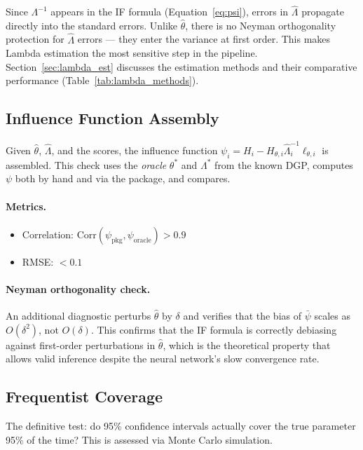 Since $\Lambda^{-1}$ appears in the IF formula (Equation~\ref{eq:psi}), errors in $\hat{\Lambda}$ propagate directly into the standard errors. Unlike $\hat{\theta}$, there is no Neyman orthogonality protection for $\hat{\Lambda}$ errors --- they enter the variance at first order. This makes Lambda estimation the most sensitive step in the pipeline. Section~\ref{sec:lambda_est} discusses the estimation methods and their comparative performance (Table~\ref{tab:lambda_methods}).

\subsection{Influence Function Assembly}\label{sec:eval_psi}

Given $\hat{\theta}$, $\hat{\Lambda}$, and the scores, the influence function $\psi_i = H_i - H_{\theta,i}\hat{\Lambda}_i^{-1}\ell_{\theta,i}$ is assembled. This check uses the \emph{oracle} $\theta^*$ and $\Lambda^*$ from the known DGP, computes $\psi$ both by hand and via the package, and compares.

\paragraph{Metrics.}
\begin{itemize}
    \item Correlation: $\mathrm{Corr}(\psi_{\text{pkg}}, \psi_{\text{oracle}}) > 0.9$
    \item RMSE: $< 0.1$
\end{itemize}

\paragraph{Neyman orthogonality check.} An additional diagnostic perturbs $\hat{\theta}$ by $\delta$ and verifies that the bias of $\bar{\psi}$ scales as $O(\delta^2)$, not $O(\delta)$. This confirms that the IF formula is correctly debiasing against first-order perturbations in $\hat{\theta}$, which is the theoretical property that allows valid inference despite the neural network's slow convergence rate.

\subsection{Frequentist Coverage}\label{sec:eval_coverage}

The definitive test: do 95\% confidence intervals actually cover the true parameter 95\% of the time? This is assessed via Monte Carlo simulation.

